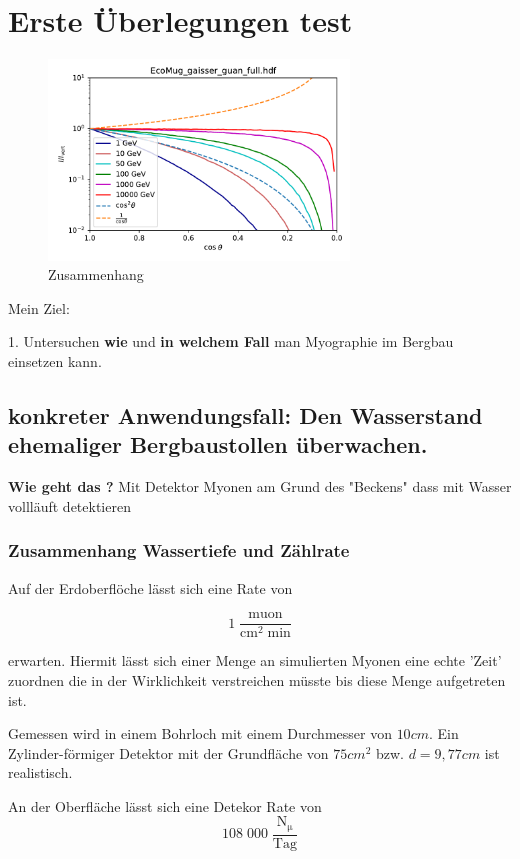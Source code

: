 \section{Erste Überlegungen test}

\begin{figure}
    \centering
    \includegraphics[width=8cm]{plots/plot.pdf}
    \caption{Zusammenhang }
    \label{fig:my_labels}
\end{figure}

Mein Ziel:

1. Untersuchen \textbf{wie} und  \textbf{in welchem Fall} man Myographie im Bergbau einsetzen kann.
\subsection{konkreter Anwendungsfall: Den Wasserstand ehemaliger Bergbaustollen überwachen.}

\textbf{Wie geht das ?}
Mit Detektor Myonen am Grund des "Beckens" dass mit Wasser vollläuft detektieren

\subsubsection{Zusammenhang Wassertiefe und Zählrate}

Auf der Erdoberflöche lässt sich eine Rate von

\begin{equation}
    1 \; \frac{\mathrm{muon}}{\mathrm{cm}^2 \; \mathrm{min}}
\end{equation} 

erwarten. Hiermit lässt sich einer Menge an simulierten Myonen eine echte 'Zeit' zuordnen die in der Wirklichkeit verstreichen müsste bis diese Menge aufgetreten ist.

Gemessen wird in einem Bohrloch mit einem Durchmesser von $10cm$.
Ein Zylinder-förmiger Detektor mit der Grundfläche von $75 cm^2$ bzw. $d=9,77cm$ ist realistisch.

An der Oberfläche lässt sich eine Detekor Rate von 
\begin{equation}
    108\; 000 \; \frac{\mathrm{N_\mathrm{\mu}}}{\mathrm{Tag}}
\end{equation}

